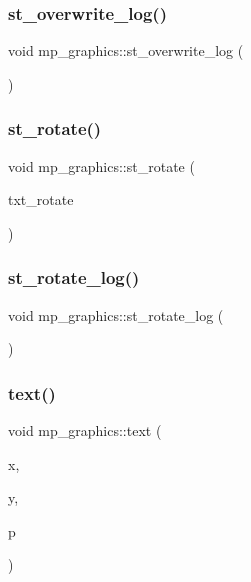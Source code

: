 \subsubsection{\texorpdfstring{st\+\_\+overwrite\+\_\+log()}{st\_overwrite\_log()}}
{\footnotesize\ttfamily void mp\+\_\+graphics\+::st\+\_\+overwrite\+\_\+log (\begin{DoxyParamCaption}{ }\end{DoxyParamCaption})}

\mbox{\label{classmp__graphics_affe1bf597014ac6ff718bf3530abfc33}} 
\subsubsection{\texorpdfstring{st\+\_\+rotate()}{st\_rotate()}}
{\footnotesize\ttfamily void mp\+\_\+graphics\+::st\+\_\+rotate (\begin{DoxyParamCaption}\item[{\mbox{\hyperlink{galois_8h_a09fddde158a3a20bd2dcadb609de11dc}{I\+NT}}}]{txt\+\_\+rotate }\end{DoxyParamCaption})}

\mbox{\label{classmp__graphics_a1b98ac38cd95b2d44e9098f5dc2cc8a2}} 
\subsubsection{\texorpdfstring{st\+\_\+rotate\+\_\+log()}{st\_rotate\_log()}}
{\footnotesize\ttfamily void mp\+\_\+graphics\+::st\+\_\+rotate\+\_\+log (\begin{DoxyParamCaption}{ }\end{DoxyParamCaption})}

\mbox{\label{classmp__graphics_ae92ece77cf1942bfee760d6cf854b74b}} 
\subsubsection{\texorpdfstring{text()}{text()}}
{\footnotesize\ttfamily void mp\+\_\+graphics\+::text (\begin{DoxyParamCaption}\item[{\mbox{\hyperlink{galois_8h_a09fddde158a3a20bd2dcadb609de11dc}{I\+NT}}}]{x,  }\item[{\mbox{\hyperlink{galois_8h_a09fddde158a3a20bd2dcadb609de11dc}{I\+NT}}}]{y,  }\item[{const char $\ast$}]{p }\end{DoxyParamCaption})}

